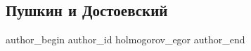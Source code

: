  
 
 
 
 
 
\subsection{Пушкин и Достоевский}
\label{sec:15_11_2021.fb.holmogorov_egor.1.pushkin_i_dostojevskij}
 
\ifcmt
 author_begin
   author_id holmogorov_egor
 author_end
\fi
